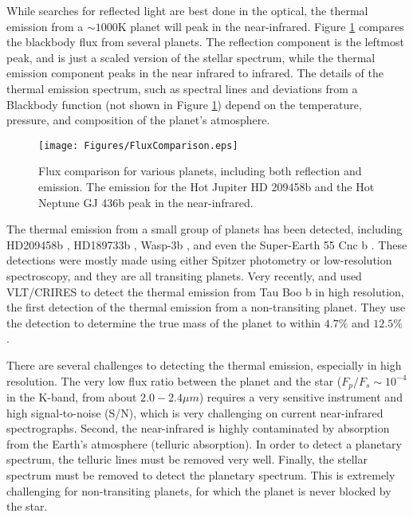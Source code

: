 \documentclass[11pt]{report}     %
\begin{document}
While searches for reflected light are best done in the optical, the
thermal emission from a $\sim 1000$K planet will peak in the
near-infrared. Figure \ref{fig:fluxcomp} compares the blackbody flux
from several planets. The
reflection component is the leftmost peak, and is just a scaled
version of the stellar spectrum, while the thermal emission component peaks
in the near infrared to infrared. The details of the thermal emission spectrum, such as spectral lines and deviations from a Blackbody function (not shown in Figure \ref{fig:fluxcomp}) depend on the temperature, pressure, and composition of the planet's atmosphere.

\begin{figure}[ht]
  \centering
  \texttt{[image: Figures/FluxComparison.eps]}
  \caption{Flux comparison for various planets, including both
    reflection and emission. The emission for the Hot Jupiter HD
    209458b and the Hot Neptune GJ 436b peak in the near-infrared.}
  \label{fig:fluxcomp}
\end{figure}

The thermal emission from a small group of planets has been detected,
including HD209458b \citep[e.g.][]{Knutson2007, Swain2008,
  Cubillos2010}, HD189733b \citep[e.g.][]{Grillmair2007, Knutson2007_2,
  Char2008, Agol2010}, Wasp-3b \citep{Zhao2012}, and even the
Super-Earth 55 Cnc b \citep{Demory2012}. These detections were mostly made
using either Spitzer photometry or low-resolution spectroscopy, and
they are all transiting planets. Very recently, \cite{Brogi2012} and 
\cite{Rodler2012} used VLT/CRIRES to detect the thermal emission from 
Tau Boo b in high resolution, the first detection of the thermal emission from a non-transiting planet. They use the detection to determine the true mass of the planet to within $4.7\%$ \citep{Brogi2012} and $12.5\%$ \citep{Rodler2012}. 

There are several challenges to detecting the thermal emission, especially in high resolution. The very low flux ratio between the planet and the star ($F_p/F_s \sim 10^{-4}$ in the K-band, from about $2.0 - 2.4 \mu m$) requires a very sensitive instrument and high signal-to-noise (S/N), which is very challenging on current near-infrared spectrographs. Second, the near-infrared is highly contaminated by absorption from the Earth's atmosphere (telluric absorption). In order to detect a planetary spectrum, the telluric lines must be removed very well. Finally, the stellar spectrum must be removed to detect the planetary spectrum. This is extremely challenging for non-transiting planets, for which the planet is never blocked by the star. 
\end{document}
